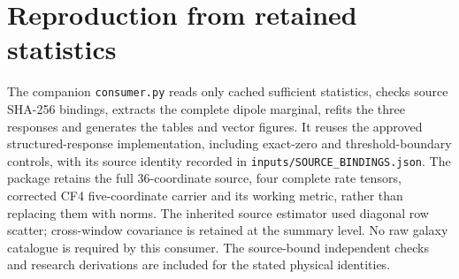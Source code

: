 \documentclass[aps,prd,reprint,onecolumn,superscriptaddress,nofootinbib]{revtex4-2}
\begin{document}
\appendix
\section{Reproduction from retained statistics}
The companion \texttt{consumer.py} reads only cached sufficient statistics, checks source SHA-256 bindings, extracts the complete dipole marginal, refits the three responses and generates the tables and vector figures. It reuses the approved structured-response implementation, including exact-zero and threshold-boundary controls, with its source identity recorded in \texttt{inputs/SOURCE\_BINDINGS.json}. The package retains the full 36-coordinate source, four complete rate tensors, corrected CF4 five-coordinate carrier and its working metric, rather than replacing them with norms. The inherited source estimator used diagonal row scatter; cross-window covariance is retained at the summary level. No raw galaxy catalogue is required by this consumer. The source-bound independent checks and research derivations are included for the stated physical identities.


\end{document}
